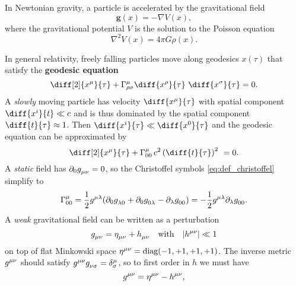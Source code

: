 In Newtonian gravity, a particle is accelerated by the gravitational field
\begin{equation}
	\mathbf{g}(x) = - \nabla V(x) ,
	\label{eq:interpretation_m:newton2}
\end{equation}
where the gravitational potential $V$ is the solution to the Poisson equation
\begin{equation}
	\nabla^2 V(x) = 4 \pi G \rho(x) .
	\label{eq:interpretation_m:poisson}
\end{equation}

In general relativity, freely falling particles move along geodesics $x(\tau)$ that satisfy the \textbf{geodesic equation}
\begin{equation}
	\diff[2]{x^\mu}{\tau} + \Gamma^\mu_{\rho \sigma} \diff{x^\rho}{\tau} \diff{x^\sigma}{\tau} = 0 .
	\label{eq:geodesic}
\end{equation}
A \emph{slowly} moving particle has velocity $\diff{x^\mu}{\tau}$ with spatial component $\diff{x^i}{t} \ll c$ and is thus dominated by the spatial component $\diff{t}{\tau} \approx 1$.
Then $\diff{x^i}{\tau} \ll \diff{x^0}{\tau}$ and the geodesic equation can be approximated by
\begin{equation*}
	\diff[2]{x^\mu}{\tau} + \Gamma^\mu_{00} \, c^2 \left( \diff{t}{\tau} \right)^2 = 0 .
\end{equation*}
A \emph{static} field has $\partial_0 g\indices{_\mu_\nu} = 0$, so the Christoffel symbols \eqref{eq:def_christoffel} simplify to
\begin{equation*}
	\Gamma^\mu_{00} = \frac{1}{2} g\indices{^\mu^\lambda} (\partial_0 g\indices{_\lambda_0} + \partial_0 g\indices{_0_\lambda} - \partial_\lambda g\indices{_0_0}) = -\frac{1}{2} g\indices{^\mu^\lambda} \partial_\lambda g\indices{_0_0} .
\end{equation*}
A \emph{weak} gravitational field can be written as a perturbation 
\begin{equation}
	g\indices{_\mu_\nu} = \eta\indices{_\mu_\nu} + h\indices{_\mu_\nu}
	\quad \text{with} \quad
	\abs{h\indices{^\mu^\nu}} \ll 1
	\label{eq:weak_field_limit:metric_perturbation}
\end{equation}
on top of flat Minkowski space $\eta\indices{^\mu^\nu} = \text{diag}(-1, +1, +1, +1)$.
The inverse metric $g\indices{^\mu^\nu}$ should satisfy $g\indices{^\mu^\nu} g\indices{_\nu_\sigma} = \delta^\mu_\sigma$, so to first order in $h$ we must have
\begin{equation*}
	g\indices{^\mu^\nu} = \eta\indices{^\mu^\nu} - h\indices{^\mu^\nu} ,
\end{equation*}
